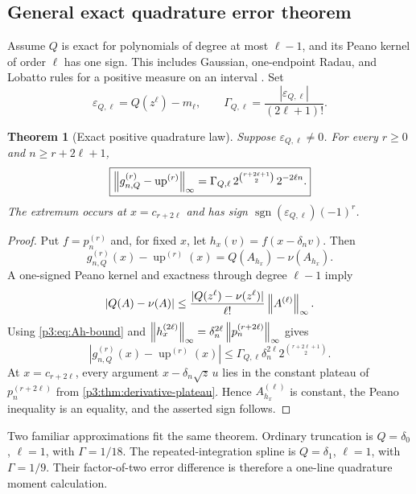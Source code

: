 \documentclass[11pt,oneside]{article}
\numberwithin{equation}{section}
\newtheorem{theorem}{Theorem}[section]
\theoremstyle{definition}
\theoremstyle{remark}
\newcommand{\Up}{\operatorname{up}}
\begin{document}
\subsection{General exact quadrature error theorem}

Assume $Q$ is exact for polynomials of degree at most $\ell-1$, and its Peano kernel
of order $\ell$ has one sign.  This includes Gaussian, one-endpoint Radau, and
Lobatto rules for a positive measure on an interval \cite{p3:davis-rabinowitz,p3:gautschi}.
Set
\begin{equation}
 \varepsilon_{Q,\ell}=Q(z^\ell)-m_\ell,
 \qquad
 \Gamma_{Q,\ell}=\frac{|\varepsilon_{Q,\ell}|}{(2\ell+1)!}.
 \label{p3:eq:gammaQ}
\end{equation}

\begin{theorem}[Exact positive quadrature law]
\label{p3:thm:quadrature-law}
Suppose $\varepsilon_{Q,\ell}\ne0$.  For every $r\ge0$ and
$n\ge r+2\ell+1$,
\begin{equation}
 \boxed{
 \norm{g_{n,Q}^{(r)}-\Up^{(r)}}_\infty
 =\Gamma_{Q,\ell}\,
 2^{\binom{r+2\ell+1}{2}}\,2^{-2\ell n}.}
 \label{p3:eq:quadrature-law}
\end{equation}
The extremum occurs at $x=c_{r+2\ell}$ and has sign
$\operatorname{sgn}(\varepsilon_{Q,\ell})(-1)^r$.
\end{theorem}

\begin{proof}
Put $f=p_n^{(r)}$ and, for fixed $x$, let
$h_x(v)=f(x-\delta_nv)$.  Then
\[
 g_{n,Q}^{(r)}(x)-\Up^{(r)}(x)
 =Q(A_{h_x})-\nu(A_{h_x}).
\]
A one-signed Peano kernel and exactness through degree $\ell-1$ imply
\[
 |Q(A)-\nu(A)|
 \le\frac{|Q(z^\ell)-\nu(z^\ell)|}{\ell!}\left\lVert A^{(\ell)}\right\rVert_\infty.
\]
Using \cref{p3:eq:Ah-bound} and
$\left\lVert h_x^{(2\ell)}\right\rVert_\infty
 =\delta_n^{2\ell}\left\lVert p_n^{(r+2\ell)}\right\rVert_\infty$ gives
\[
 |g_{n,Q}^{(r)}(x)-\Up^{(r)}(x)|
 \le\Gamma_{Q,\ell}\delta_n^{2\ell}
 2^{\binom{r+2\ell+1}{2}}.
\]
At $x=c_{r+2\ell}$, every argument
$x-\delta_n\sqrt z\,u$ lies in the constant plateau of
$p_n^{(r+2\ell)}$ from \cref{p3:thm:derivative-plateau}.  Hence
$A_{h_x}^{(\ell)}$ is constant, the Peano inequality is an equality, and the asserted
sign follows.
\end{proof}

Two familiar approximations fit the same theorem.  Ordinary truncation is
$Q=\delta_0$, $\ell=1$, with $\Gamma=1/18$.  The repeated-integration spline is
$Q=\delta_1$, $\ell=1$, with $\Gamma=1/9$.  Their factor-of-two error difference is
therefore a one-line quadrature moment calculation.
\end{document}
